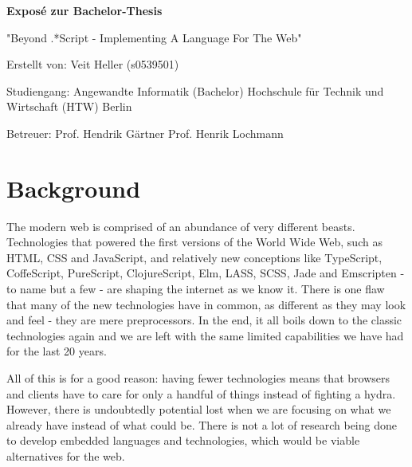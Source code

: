 \documentclass[oneside,11pt,xetex]{scrbook}
\begin{document}
\renewcommand{\thepage}{\roman{page}}

\pagestyle{empty}

\frontmatter

\vspace*{0.4\textheight}

\begin{flushleft}
\Large{\textbf{Exposé zur Bachelor-Thesis}}
\vspace{0.5cm}

\large{"Beyond .*Script - Implementing A Language For The Web"}
\vspace{0.5cm}

Erstellt von: Veit Heller (s0539501)
\vspace{0.1cm}

Studiengang:  Angewandte Informatik (Bachelor)\linebreak
Hochschule für Technik und Wirtschaft (HTW) Berlin
\vspace{0.2cm}

Betreuer:\linebreak
Prof. Hendrik Gärtner\linebreak
Prof. Henrik Lochmann
\end{flushleft}

\date{\today}

\clearpage

\section*{Background}

The modern web is comprised of an abundance of very different beasts. Technologies that powered the first versions of the World Wide Web, such as HTML, CSS and JavaScript, and relatively new conceptions like TypeScript, CoffeScript, PureScript, ClojureScript, Elm, LASS, SCSS, Jade and Emscripten - to name but a few - are shaping the internet as we know it. There is one flaw that many of the new technologies have in common, as different as they may look and feel - they are mere preprocessors. In the end, it all boils down to the classic technologies again and we are left with the same limited capabilities we have had for the last 20 years.

All of this is for a good reason: having fewer technologies means that browsers and clients have to care for only a handful of things instead of fighting a hydra. However, there is undoubtedly potential lost when we are focusing on what we already have instead of what could be. There is not a lot of research being done to develop embedded languages and technologies, which would be viable alternatives for the web.
\end{document}

